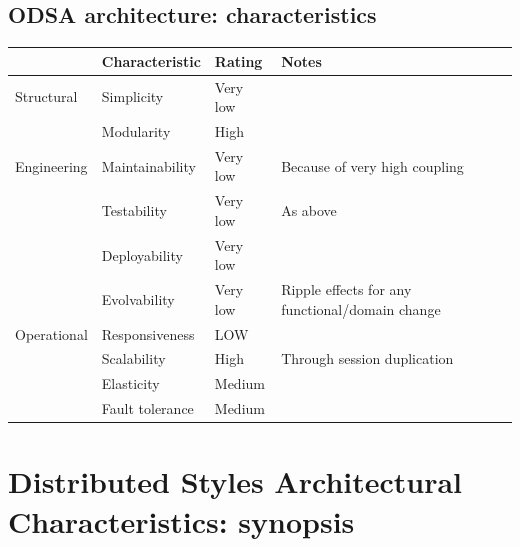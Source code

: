 \subsection{ODSA architecture: characteristics}

\begin{table}[h!]
  \renewcommand{\arraystretch}{1.3}
  \centering
  \begin{tabularx}{\textwidth}{l l l X}
    \toprule
    \textbf{}   & \textbf{Characteristic} & \textbf{Rating} & \textbf{Notes}                                  \\
    \midrule
    Structural  & Simplicity              & Very low        &                                                 \\
                & Modularity              & High            &                                                 \\
    \midrule
    Engineering & Maintainability         & Very low        & Because of very high coupling                   \\
                & Testability             & Very low        & As above                                        \\
                & Deployability           & Very low        &                                                 \\
                & Evolvability            & Very low        & Ripple effects for any functional/domain change \\
    \midrule
    Operational & Responsiveness          & LOW             &                                                 \\
                & Scalability             & High            & Through session duplication                     \\
                & Elasticity              & Medium          &                                                 \\
                & Fault tolerance         & Medium          &                                                 \\
    \bottomrule
  \end{tabularx}
\end{table}

\section{Distributed Styles Architectural Characteristics: synopsis}


